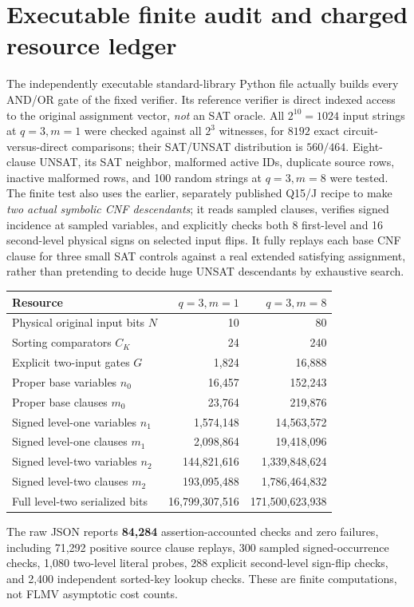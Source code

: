 \documentclass[11pt]{article}
\begin{document}
\section{Executable finite audit and charged resource ledger}
The independently executable standard-library Python file
 actually builds every
AND/OR gate of the fixed verifier. Its reference verifier is direct
indexed access to the original assignment vector, \emph{not} an SAT
oracle. All $2^{10}=1024$ input strings at $q=3,m=1$ were checked
against all $2^3$ witnesses, for $8192$ exact circuit-versus-direct
comparisons; their SAT/UNSAT distribution is $560/464$. Eight-clause
UNSAT, its SAT neighbor, malformed active IDs, duplicate source rows,
inactive malformed rows, and 100 random strings at $q=3,m=8$ were tested.
The finite test also uses the earlier, separately published Q15/J recipe
to make \emph{two actual symbolic CNF descendants}; it reads sampled
clauses, verifies signed incidence at sampled variables, and explicitly
checks both 8 first-level and 16 second-level physical signs on selected
input flips. It fully replays each base CNF clause for three small SAT
controls against a real extended satisfying assignment, rather than
pretending to decide huge UNSAT descendants by exhaustive search.

\begin{center}\small
\begin{tabular}{lrr}
\toprule
Resource & $q=3,m=1$ & $q=3,m=8$\\\midrule
Physical original input bits $N$&10&80\\
Sorting comparators $C_K$&24&240\\
Explicit two-input gates $G$&1,824&16,888\\
Proper base variables $n_0$&16,457&152,243\\
Proper base clauses $m_0$&23,764&219,876\\
Signed level-one variables $n_1$&1,574,148&14,563,572\\
Signed level-one clauses $m_1$&2,098,864&19,418,096\\
Signed level-two variables $n_2$&144,821,616&1,339,848,624\\
Signed level-two clauses $m_2$&193,095,488&1,786,464,832\\
Full level-two serialized bits&16,799,307,516&171,500,623,938\\\bottomrule
\end{tabular}
\end{center}
The raw JSON reports \textbf{84,284} assertion-accounted checks and zero
failures, including 71,292 positive source clause replays, 300 sampled
signed-occurrence checks, 1,080 two-level literal probes, 288 explicit
second-level sign-flip checks, and 2,400 independent sorted-key lookup
checks. These are finite computations, not FLMV asymptotic cost counts.
\end{document}
